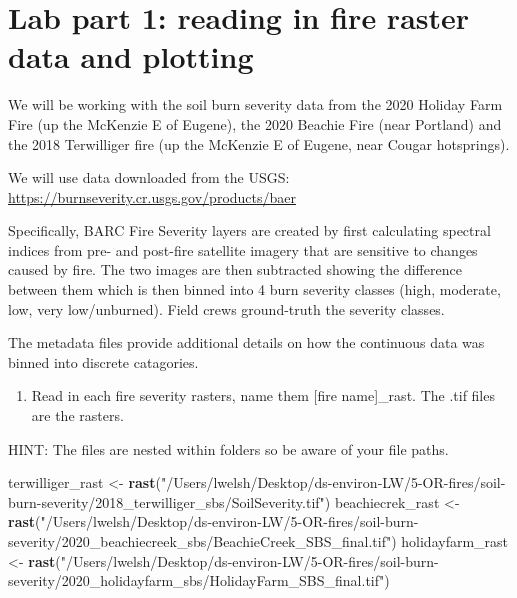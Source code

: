 \documentclass[
]{article}
\newenvironment{Shaded}{\begin{snugshade}}{\end{snugshade}}
\newcommand{\FunctionTok}[1]{\textcolor[rgb]{0.13,0.29,0.53}{\textbf{#1}}}
\newcommand{\NormalTok}[1]{#1}
\newcommand{\OtherTok}[1]{\textcolor[rgb]{0.56,0.35,0.01}{#1}}
\newcommand{\StringTok}[1]{\textcolor[rgb]{0.31,0.60,0.02}{#1}}
\providecommand{\tightlist}{%
  \setlength{\itemsep}{0pt}\setlength{\parskip}{0pt}}
\begin{document}
\hypertarget{lab-part-1-reading-in-fire-raster-data-and-plotting}{%
\section{Lab part 1: reading in fire raster data and
plotting}\label{lab-part-1-reading-in-fire-raster-data-and-plotting}}

We will be working with the soil burn severity data from the 2020
Holiday Farm Fire (up the McKenzie E of Eugene), the 2020 Beachie Fire
(near Portland) and the 2018 Terwilliger fire (up the McKenzie E of
Eugene, near Cougar hotsprings).

We will use data downloaded from the USGS:
\url{https://burnseverity.cr.usgs.gov/products/baer}

Specifically, BARC Fire Severity layers are created by first calculating
spectral indices from pre- and post-fire satellite imagery that are
sensitive to changes caused by fire. The two images are then subtracted
showing the difference between them which is then binned into 4 burn
severity classes (high, moderate, low, very low/unburned). Field crews
ground-truth the severity classes.

The metadata files provide additional details on how the continuous data
was binned into discrete catagories.

\begin{enumerate}
\def\labelenumi{\alph{enumi}.}
\tightlist
\item
  Read in each fire severity rasters, name them {[}fire name{]}\_rast.
  The .tif files are the rasters.
\end{enumerate}

HINT: The files are nested within folders so be aware of your file
paths.

\begin{Shaded}
\begin{Highlighting}[]
\NormalTok{terwilliger\_rast }\OtherTok{\textless{}{-}} \FunctionTok{rast}\NormalTok{(}\StringTok{"/Users/lwelsh/Desktop/ds{-}environ{-}LW/5{-}OR{-}fires/soil{-}burn{-}severity/2018\_terwilliger\_sbs/SoilSeverity.tif"}\NormalTok{)}
\NormalTok{beachiecrek\_rast }\OtherTok{\textless{}{-}} \FunctionTok{rast}\NormalTok{(}\StringTok{"/Users/lwelsh/Desktop/ds{-}environ{-}LW/5{-}OR{-}fires/soil{-}burn{-}severity/2020\_beachiecreek\_sbs/BeachieCreek\_SBS\_final.tif"}\NormalTok{)}
\NormalTok{holidayfarm\_rast }\OtherTok{\textless{}{-}} \FunctionTok{rast}\NormalTok{(}\StringTok{"/Users/lwelsh/Desktop/ds{-}environ{-}LW/5{-}OR{-}fires/soil{-}burn{-}severity/2020\_holidayfarm\_sbs/HolidayFarm\_SBS\_final.tif"}\NormalTok{)}
\end{Highlighting}
\end{Shaded}
\end{document}
